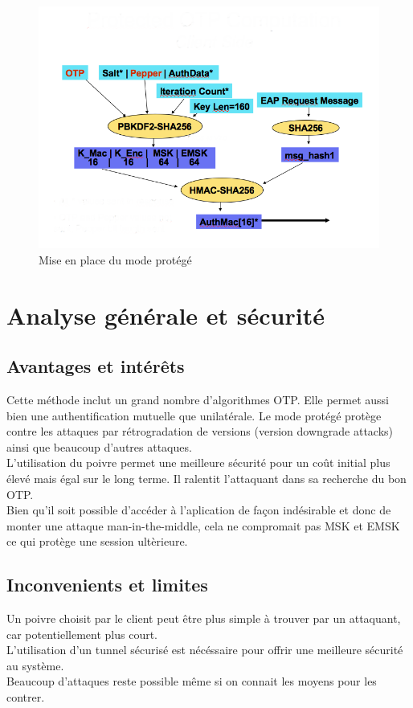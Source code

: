 \documentclass{article}
\begin{document}
\begin{figure}[!h]
  \centering
  \includegraphics[width=400pt]{image3.png}
  \caption{Mise en place du mode protégé}
  \label{fig:image}
\end{figure}

\section{Analyse générale et sécurité}

\subsection{Avantages et intér\^ets}
  Cette méthode inclut un grand nombre d'algorithmes OTP.
  Elle permet aussi bien une authentification mutuelle que unilatérale.
  Le mode protégé protège contre les attaques par rétrogradation de versions (version downgrade attacks) ainsi que beaucoup d'autres attaques.\\
  L'utilisation du poivre permet une meilleure sécurité pour un coût initial plus élevé mais égal sur le long terme.
  Il ralentit l'attaquant dans sa recherche du bon OTP.\\
  
  Bien qu'il soit possible d'accéder à l'aplication de façon indésirable et donc de monter une attaque man-in-the-middle, cela ne compromait pas MSK et EMSK ce qui protège une session ultèrieure.
  
  \subsection{Inconvenients et limites}
  Un poivre choisit par le client peut être plus simple à trouver par un attaquant, car potentiellement plus court.\\
  L'utilisation d'un tunnel sécurisé est nécéssaire pour offrir une meilleure sécurité au système.\\
  Beaucoup d'attaques reste possible même si on connait les moyens pour les contrer.
\end{document}
